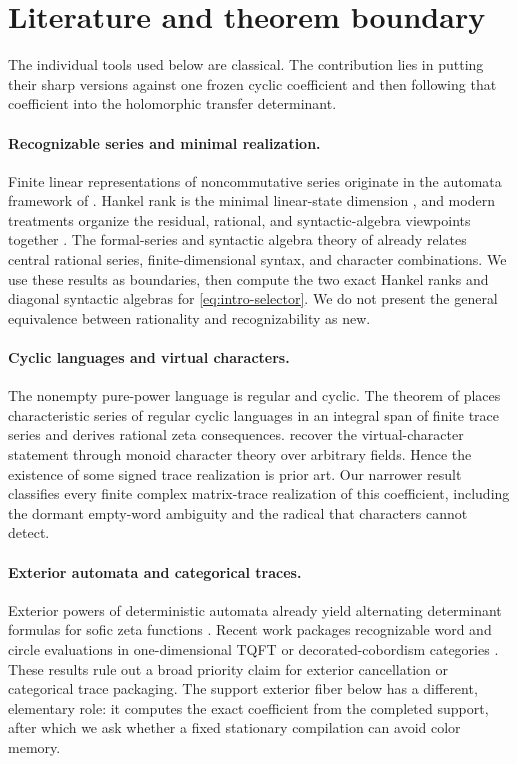 \section{Literature and theorem boundary}
\label{sec:literature}

The individual tools used below are classical.  The contribution lies in
putting their sharp versions against one frozen cyclic coefficient and then
following that coefficient into the holomorphic transfer determinant.

\paragraph{Recognizable series and minimal realization.}
Finite linear representations of noncommutative series originate in the
automata framework of \citet{schutzenberger1961automata}.  Hankel rank is the
minimal linear-state dimension \citep{carlyle1971realizations}, and modern
treatments organize the residual, rational, and syntactic-algebra viewpoints
together \citep{berstel2010noncommutative}.  The formal-series and syntactic
algebra theory of \citet{reutenauer1980syntactiques} already relates central
rational series, finite-dimensional syntax, and character combinations.  We
use these results as boundaries, then compute the two exact Hankel ranks and
diagonal syntactic algebras for \eqref{eq:intro-selector}.  We do not present
the general equivalence between rationality and recognizability as new.

\paragraph{Cyclic languages and virtual characters.}
The nonempty pure-power language is regular and cyclic.  The theorem of
\citet{berstel1990zeta} places characteristic series of regular cyclic
languages in an integral span of finite trace series and derives rational
zeta consequences.  \citet{masuda2015characters} recover the virtual-character
statement through monoid character theory over arbitrary fields.  Hence the
existence of some signed trace realization is prior art.  Our narrower result
classifies every finite complex matrix-trace realization of this coefficient,
including the dormant empty-word ambiguity and the radical that characters
cannot detect.

\paragraph{Exterior automata and categorical traces.}
Exterior powers of deterministic automata already yield alternating
determinant formulas for sofic zeta functions
\citep{beal1995exterior}.  Recent work packages recognizable word and circle
evaluations in one-dimensional TQFT or decorated-cobordism categories
\citep{gustafson2023automata,khovanov2024cobordisms}.  These results rule out a
broad priority claim for exterior cancellation or categorical trace
packaging.  The support exterior fiber below has a different, elementary
role: it computes the exact coefficient from the completed support, after
which we ask whether a fixed stationary compilation can avoid color memory.

